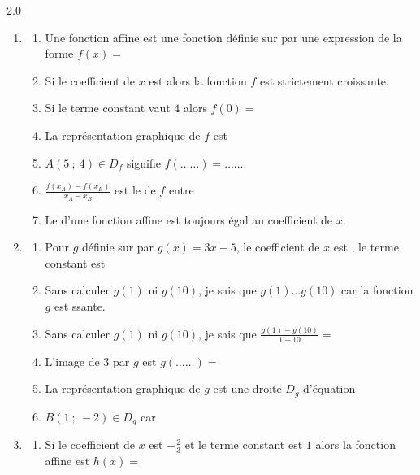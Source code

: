 \documentclass[main.tex]{subfiles}
\begin{document}
\begin{exercise}\hfill 
\vspace{-0.5em} 
\noindent
\begin{spacing}{2.0} 
\begin{enumerate}[label={\arabic*)}, leftmargin=*]
	\item 
	\begin{enumerate}[label={}, leftmargin=*]
		\item Une fonction affine est une fonction définie sur \dotfill  par une expression de la forme $f(x)=$\dotfill
		\item Si le coefficient de $x$ est \dotfill alors la fonction $f$ est strictement croissante.
		\item Si le terme constant vaut $4$ alors $f(0)=$\dotfill
		\item La représentation graphique de $f$ est \dotfill 
		\item $A(5~;~4)\in D_f$ signifie $f(\ldots\ldots)=\ldots\ldots$.
		\item $\frac{f(x_A)-f(x_B)}{x_A-x_B}$ est le \dotfill de $f$ entre \dotfill  
		\item Le \dotfill d'une fonction affine est toujours égal  au coefficient de $x$.
\end{enumerate} 
\item 
	\begin{enumerate}[label={}, leftmargin=*]
		\item Pour $g$ définie sur \dotfill  par $g(x)=3x-5$, le coefficient de $x$ est \dotfill, le terme constant est \dotfill
		\item Sans calculer $g(1)$ ni $g(10)$, je sais que $g(1)\ldots g(10)$ car la fonction $g$ est \dotfill ssante. 
		\item Sans calculer $g(1)$ ni $g(10)$, je sais que $\frac{g(1)-g(10)}{1-10}=$\dotfill 
		\item L'image de $3$ par $g$ est $g(\ldots\ldots)=$\dotfill 
		\item La représentation graphique de $g$ est une droite $D_g$ \dotfill d'équation \dotfill 
		\item $B(1~;~-2)\in D_g$ car \dotfill 
	\end{enumerate} 
\item 
\begin{enumerate}[label={}, leftmargin=*]
		\item  Si le coefficient de $x$ est $-\frac{2}{3}$ et le terme constant est $1$ alors  la fonction affine est $h(x)=$\dotfill 

\end{enumerate}
\end{enumerate}
\end{spacing}
\end{exercise}
\end{document}
